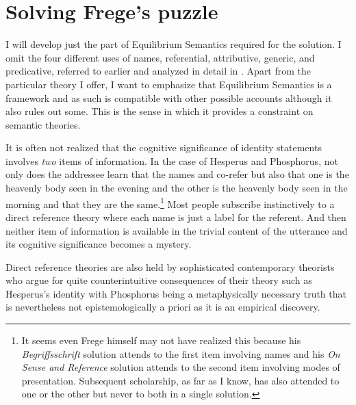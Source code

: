 

\section{Solving Frege's puzzle} \label{sec:solving Frege's puzzle}

I will develop just the part of Equilibrium Semantics required for the solution. I omit the four different uses of names, referential, attributive, generic, and predicative, referred to earlier and analyzed in detail in \citet[Chapter~6]{parikh:le}. Apart from the particular theory I offer, I want to emphasize that Equilibrium Semantics is a framework and as such is compatible with other possible accounts although it also rules out some. This is the sense in which it provides a constraint on semantic theories. 


It is often not realized that the cognitive significance of identity statements involves \emph{two} items of information. In the case of Hesperus and Phosphorus, not only does the addressee learn that the names  and  co-refer but also that one is the heavenly body seen in the evening and the other is the heavenly body seen in the morning and that they are the same.\footnote{It seems even Frege himself may not have realized this because his \emph{Begriffsschrift} solution attends to the first item involving names and his \emph{On Sense and Reference} solution attends to the second item involving modes of presentation. Subsequent scholarship, as far as I know, has also attended to one or the other but never to both in a single solution.} Most people subscribe instinctively to a direct reference theory where each name is just a label for the referent. And then neither item of information is available in the trivial content of the utterance and its cognitive significance becomes a mystery.


Direct reference theories are also held by sophisticated contemporary theorists who argue for quite counterintuitive consequences of their theory such as Hesperus's identity with Phosphorus being a metaphysically necessary truth that is nevertheless not epistemologically a priori as it is an empirical discovery.

